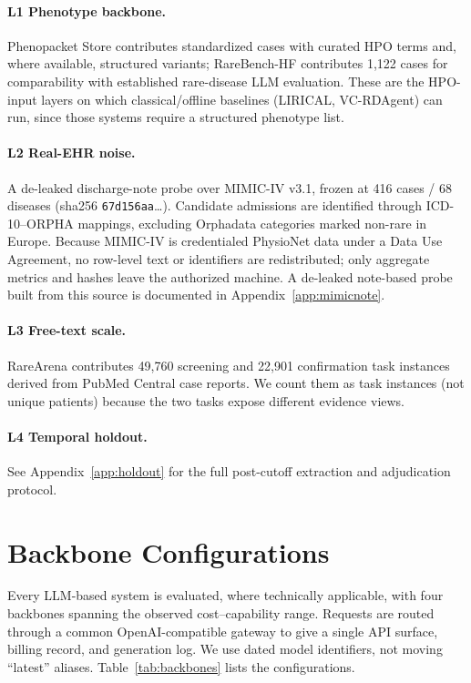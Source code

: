 \documentclass[letterpaper]{article} %
\begin{document}
\paragraph{L1 Phenotype backbone.}
Phenopacket Store contributes standardized cases with curated HPO terms and,
where available, structured variants; RareBench-HF contributes 1,122 cases for
comparability with established rare-disease LLM evaluation. These are the
HPO-input layers on which classical/offline baselines (LIRICAL, VC-RDAgent) can
run, since those systems require a structured phenotype list.

\paragraph{L2 Real-EHR noise.}
A de-leaked discharge-note probe over MIMIC-IV v3.1, frozen at 416 cases /
68 diseases (sha256 \texttt{67d156aa}\ldots). Candidate admissions are identified
through ICD-10--ORPHA mappings, excluding Orphadata categories marked non-rare
in Europe. Because MIMIC-IV is credentialed PhysioNet data under a Data Use
Agreement, no row-level text or identifiers are redistributed; only aggregate
metrics and hashes leave the authorized machine. A de-leaked note-based probe
built from this source is documented in Appendix~\ref{app:mimicnote}.

\paragraph{L3 Free-text scale.}
RareArena contributes 49,760 screening and 22,901 confirmation task instances
derived from PubMed Central case reports. We count them as task instances (not
unique patients) because the two tasks expose different evidence views.

\paragraph{L4 Temporal holdout.}
See Appendix~\ref{app:holdout} for the full post-cutoff extraction and
adjudication protocol.

\section{Backbone Configurations}
\label{app:backbones}

Every LLM-based system is evaluated, where technically applicable, with four
backbones spanning the observed cost--capability range. Requests are routed
through a common OpenAI-compatible gateway to give a single API surface,
billing record, and generation log. We use dated model identifiers, not moving
``latest'' aliases. Table~\ref{tab:backbones} lists the configurations.
\end{document}
